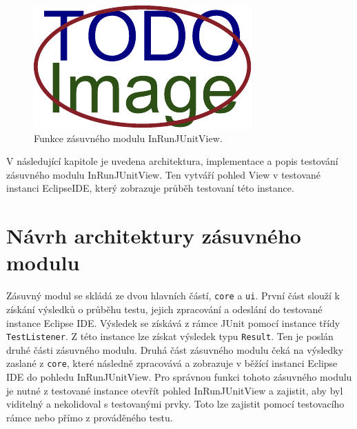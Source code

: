 \begin{figure}[!h]
  \includegraphics[width=\textwidth, center]{obrazky-figures/placeholder.pdf}
  \caption{Funkce zásuvného modulu InRunJUnitView.}
  \label{fig:inrunjunitview_principle}
\end{figure}
V následující kapitole je uvedena architektura, implementace a popis testování zásuvného modulu InRunJUnitView. Ten vytváří pohled View v testované instanci EclipseIDE, který zobrazuje průběh testovaní této instance.


  \section{Návrh architektury zásuvného modulu}
  
  Zásuvný modul se skládá ze dvou hlavních částí, \texttt{core} a \texttt{ui}. První část slouží k získání výsledků o průběhu testu, jejich zpracování a odeslání do testované instance Eclipse IDE. Výsledek se získává z rámce JUnit pomocí instance třídy \texttt{TestListener}. Z této instance lze získat výsledek typu \texttt{Result}. Ten je poslán druhé části zásuvného modulu. Druhá část zásuvného modulu čeká na výsledky zaslané z \texttt{core}, které následně zpracovává a zobrazuje v běžící instanci Eclipse IDE do pohledu InRunJUnitView. Pro správnou funkci tohoto zásuvného modulu je nutné z testované instance otevřít pohled InRunJUnitView a zajistit, aby byl viditelný a nekolidoval s testovanými prvky. Toto lze zajistit pomocí testovacího rámce nebo přímo z prováděného testu.

